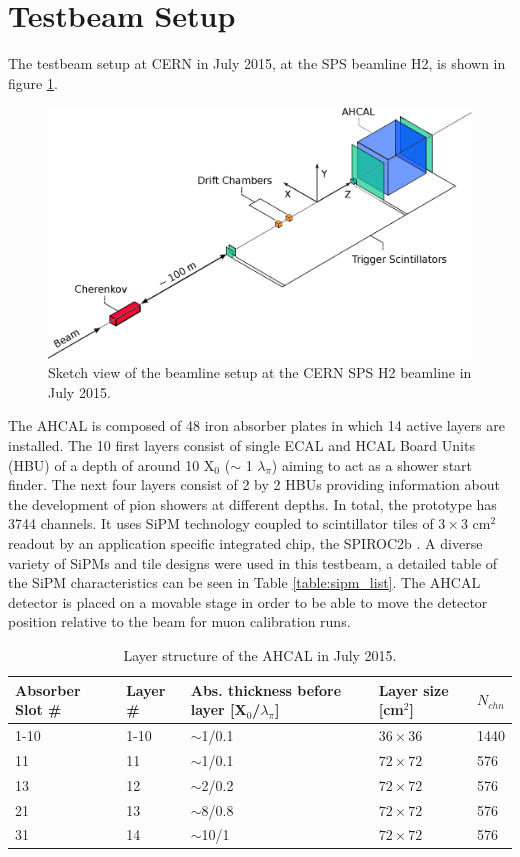 \documentclass{JINST}
\begin{document}
\section{Testbeam Setup}

The testbeam setup at CERN in July 2015, at the SPS beamline H2, is shown in figure \ref{fig:TestbeamScketch}.

\begin{figure}[htbp!]
  \centering
  \includegraphics[width=0.7\linewidth]{fig/TestbeamSetup.eps}
  \caption{Sketch view of the beamline setup at the CERN SPS H2 beamline in July 2015.} \label{fig:TestbeamScketch}
\end{figure}

The AHCAL is composed of 48 iron absorber plates in which 14 active layers are installed. The 10 first layers consist of single ECAL and HCAL Board Units (HBU) of a depth of around 10 X$_0$ ($\sim$ 1 $\lambda_{\pi}$) aiming to act as a shower start finder. The next four layers consist of 2 by 2 HBUs providing information about the development of pion showers at different depths. In total, the prototype has 3744 channels. It uses SiPM technology coupled to scintillator tiles of $3\times3$ cm$^2$ readout by an application specific integrated chip, the SPIROC2b \cite{5401891}. A diverse variety of SiPMs and tile designs were used in this testbeam, a detailed table of the SiPM characteristics can be seen in Table \ref{table:sipm_list}. The AHCAL detector is placed on a movable stage in order to be able to move the detector position relative to the beam for muon calibration runs.

\begin{table}[htb!]
  \centering
  \caption{Layer structure of the AHCAL in July 2015.}
  \label{table:muon_sel}
  \begin{tabular}{@{}lllll@{}}
    \toprule
    Absorber Slot \# & Layer \# & Abs. thickness before layer [X$_0$/$\lambda_{\pi}$] & Layer size [cm$^{2}$] & $N_{chn}$\\
    \midrule
    1-10 & 1-10 & $\sim$1/0.1 & $36\times36$ & 1440\\
    11 & 11 & $\sim$1/0.1 & $72\times72$ & 576\\
    13 & 12 & $\sim$2/0.2 & $72\times72$ & 576\\
    21 & 13 & $\sim$8/0.8 & $72\times72$ & 576\\
    31 & 14 & $\sim$10/1 & $72\times72$ & 576\\
    \bottomrule
  \end{tabular}
\end{table}
\end{document}
